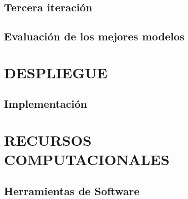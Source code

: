 \subsection{Tercera iteración}

\subsection{Evaluación de los mejores modelos}

\section{DESPLIEGUE}

\subsection{Implementación}

\section{RECURSOS COMPUTACIONALES}

\subsection{Herramientas de Software}





